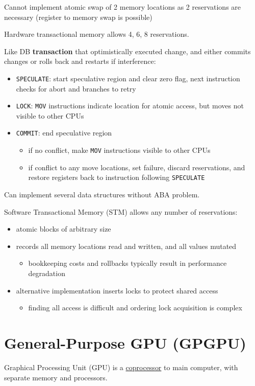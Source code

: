 \documentclass[11pt]{article}
\begin{document}
Cannot implement atomic swap of 2 memory locations as 2 reservations are necessary (register to
memory swap is possible)

Hardware transactional memory allows 4, 6, 8 reservations.

Like DB \textbf{transaction} that optimistically executed change, and either commits changes or rolls
back and restarts if interference:
\begin{itemize}
\item \texttt{SPECULATE}: start speculative region and clear zero flag, next instruction checks for abort
and branches to retry
\item \texttt{LOCK}: \texttt{MOV} instructions indicate location for atomic access, but moves not visible to other
CPUs
\item \texttt{COMMIT}: end speculative region
\begin{itemize}
\item if no conflict, make \texttt{MOV} instructions visible to other CPUs
\item if conflict to any move locations, set failure, discard reservations, and restore
registers back to instruction following \texttt{SPECULATE}
\end{itemize}
\end{itemize}

Can implement several data structures without ABA problem.

Software Transactional Memory (STM) allows any number of reservations:
\begin{itemize}
\item atomic blocks of arbitrary size
\item records all memory locations read and written, and all values mutated
\begin{itemize}
\item bookkeeping costs and rollbacks typically result in performance degradation
\end{itemize}
\item alternative implementation inserts locks to protect shared access
\begin{itemize}
\item finding all access is difficult and ordering lock acquisition is complex
\end{itemize}
\end{itemize}
\section{General-Purpose GPU (GPGPU)}
\label{sec:orgc056397}
Graphical Processing Unit (GPU) is a \uline{coprocessor} to main computer, with separate memory
and processors.
\end{document}
